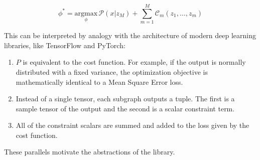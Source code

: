 \documentclass[10pt]{article}
\begin{document}
\begin{equation*}
  \phi^* = \underset{\phi}{\text{argmax}} \, \mathcal{P}(x | z_M) + \sum_{m=1}^{M}\mathcal{C}_m(z_1, \ldots, z_m )
\end{equation*}

This can be interpreted by analogy with the architecture of modern deep learning libraries, like TensorFlow and PyTorch:

\begin{enumerate}
  \item $P$ is equivalent to the cost function. For example, if the output is normally distributed with a fixed variance, the optimization objective is mathematically identical to a Mean Square Error loss.
  \item Instead of a single tensor, each subgraph outputs a tuple. The first is a sample tensor of the output and the second is a scalar constraint term. 
  \item All of the constraint scalars are summed and added to the loss given by the cost function.
\end{enumerate}

These parallels motivate the abstractions of the library. 
\end{document}
